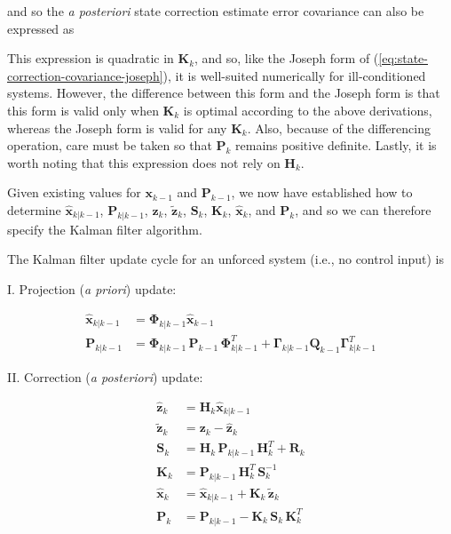 \documentclass[12pt]{article}
\begin{document}
and so the \textit{a posteriori} state correction estimate error covariance can also be expressed as


This expression is quadratic in $\mathbf{K}_k$, and so, like the Joseph form of
(\ref{eq:state-correction-covariance-joseph}), it is well-suited numerically for
ill-conditioned systems. However, the difference between this form and the Joseph form
is that this form is valid only when $\mathbf{K}_k$ is optimal according to the above
derivations, whereas the Joseph form is valid for any $\mathbf{K}_k$. Also, because of
the differencing operation, care must be taken so that $\mathbf{P}_k$ remains positive
definite. Lastly, it is worth noting that this expression does not rely on $\mathbf{H}_k$.

Given existing values for $\mathbf{x}_{k-1}$ and $\mathbf{P}_{k-1}$, we now have established
how to determine $\hat{\mathbf{x}}_{k|k-1}$, $\mathbf{P}_{k|k-1}$, $\hat{\mathbf{z}}_{k}$,
$\tilde{\mathbf{z}}_{k}$, $\mathbf{S}_{k}$, $\mathbf{K}_{k}$, $\hat{\mathbf{x}}_k$,
and $\mathbf{P}_k$, and so we can therefore specify the Kalman filter algorithm.

The Kalman filter update cycle for an unforced system (i.e., no control input) is

I. Projection (\textit{a priori}) update:

\begin{equation*}
    \begin{aligned}
        \hat{\mathbf{x}}_{k|k-1} &= \mathbf{\Phi}_{k|k-1} \hat{\mathbf{x}}_{k-1} \\
        \mathbf{P}_{k|k-1} &= \mathbf{\Phi}_{k|k-1} \, \mathbf{P}_{k-1} \, \mathbf{\Phi}_{k|k-1}^T + \mathbf{\Gamma}_{k|k-1} \mathbf{Q}_{k-1} \mathbf{\Gamma}_{k|k-1}^T
    \end{aligned}
\end{equation*}

II. Correction (\textit{a posteriori}) update:

\begin{equation*}
    \begin{aligned}
        \hat{\mathbf{z}}_k &= \mathbf{H}_k \hat{\mathbf{x}}_{k|k-1} \\
        \tilde{\mathbf{z}}_k &= \mathbf{z}_k - \hat{\mathbf{z}}_k \\
        \mathbf{S}_{k} &= \mathbf{H}_{k} \, \mathbf{P}_{k|k-1} \, \mathbf{H}_{k}^T + \mathbf{R}_{k} \\
        \mathbf{K}_{k} &= \mathbf{P}_{k|k-1} \, \mathbf{H}_{k}^T \, \mathbf{S}_{k}^{-1} \\
        \hat{\mathbf{x}}_k &= \hat{\mathbf{x}}_{k|k-1} +\mathbf{K}_k \, \tilde{\mathbf{z}}_k \\
        \mathbf{P}_k &= \mathbf{P}_{k|k-1} - \mathbf{K}_{k} \, \mathbf{S}_{k} \, \mathbf{K}_{k}^T
    \end{aligned}
\end{equation*}
\end{document}
